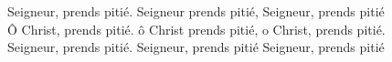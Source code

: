 Seigneur, prends pitié. Seigneur prends pitié, Seigneur, prends pitié\\
Ô Christ, prends pitié. ô Christ prends pitié, o Christ, prends pitié.\\
Seigneur, prends pitié. Seigneur, prends pitié Seigneur, prends pitié
